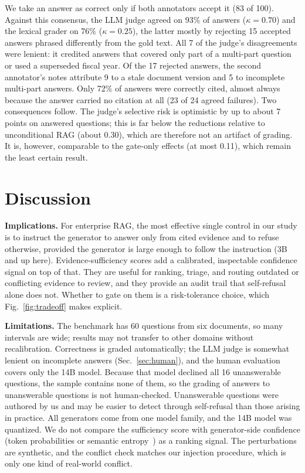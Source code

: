\documentclass[conference,letterpaper]{IEEEtran}
\begin{document}
We take an answer as correct only if both annotators accept it (83 of 100). Against this
consensus, the LLM judge agreed on 93\% of answers ($\kappa=0.70$) and the lexical grader on 76\%
($\kappa=0.25$), the latter mostly by rejecting 15 accepted answers phrased differently from the
gold text. All 7 of the judge's disagreements were lenient: it credited answers that covered only
part of a multi-part question or used a superseded fiscal year. Of the 17 rejected answers, the
second annotator's notes attribute 9 to a stale document version and 5 to incomplete multi-part
answers. Only
72\% of answers were correctly cited, almost always because the answer carried no citation at all
(23 of 24 agreed failures). Two consequences follow. The judge's selective risk is optimistic by
up to about 7 points on answered questions; this is far below the reductions relative to
unconditional RAG (about 0.30), which are therefore not an artifact of grading. It is, however,
comparable to the gate-only effects (at most 0.11), which remain the least certain result.

\section{Discussion}
\textbf{Implications.} For enterprise RAG, the most effective single control in our study is to
instruct the generator to answer only from cited evidence and to refuse otherwise, provided the
generator is large enough to follow the instruction (3B and up here). Evidence-sufficiency scores
add a calibrated, inspectable confidence signal on top of that. They are useful for ranking,
triage, and routing outdated or conflicting evidence to review, and they provide an audit trail
that self-refusal alone does not. Whether to gate on them is a risk-tolerance choice, which
Fig.~\ref{fig:tradeoff} makes explicit.

\textbf{Limitations.} The benchmark has 60 questions from six documents, so many intervals are
wide; results may not transfer to other domains without recalibration. Correctness is graded
automatically; the LLM judge is somewhat lenient on incomplete answers (Sec.~\ref{sec:human}),
and the human evaluation covers only the 14B model. Because that model declined all 16
unanswerable questions, the sample contains none of them, so the grading of answers to
unanswerable questions is not human-checked. Unanswerable questions were authored by us and may
be easier to detect through self-refusal than those arising in practice. All generators come
from one model family, and the 14B model was quantized. We do not compare the sufficiency score
with generator-side confidence (token probabilities or semantic
entropy~\cite{farquhar2024semantic}) as a ranking signal. The perturbations are synthetic, and the conflict check matches our injection procedure, which
is only one kind of real-world conflict.
\end{document}
